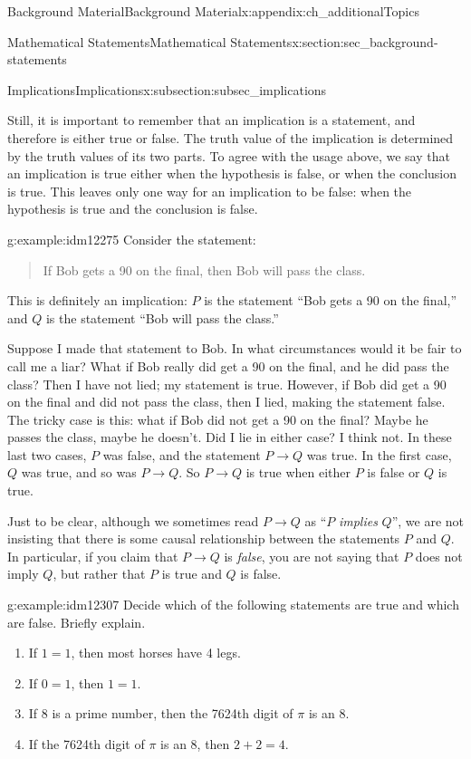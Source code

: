 \documentclass[oneside,10pt,]{book}
\numberwithin{equation}{chapter}
\def\imp{\rightarrow}
\begin{document}
\begin{appendixptx}{Background Material}{}{Background Material}{}{}{x:appendix:ch_additionalTopics}
\begin{sectionptx}{Mathematical Statements}{}{Mathematical Statements}{}{}{x:section:sec_background-statements}
\begin{subsectionptx}{Implications}{}{Implications}{}{}{x:subsection:subsec_implications}
\par
Still, it is important to remember that an implication is a statement, and therefore is either true or false. The truth value of the implication is determined by the truth values of its two parts. To agree with the usage above, we say that an implication is true either when the hypothesis is false, or when the conclusion is true. This leaves only one way for an implication to be false: when the hypothesis is true and the conclusion is false.%
\begin{example}{}{g:example:idm12275}%
Consider the statement:%
\begin{quote}%
If Bob gets a 90 on the final, then Bob will pass the class.%
\end{quote}
This is definitely an implication: \(P\) is the statement ``Bob gets a 90 on the final,'' and \(Q\) is the statement ``Bob will pass the class.''%
\par
Suppose I made that statement to Bob. In what circumstances would it be fair to call me a liar? What if Bob really did get a 90 on the final, and he did pass the class? Then I have not lied; my statement is true. However, if Bob did get a 90 on the final and did not pass the class, then I lied, making the statement false. The tricky case is this: what if Bob did not get a 90 on the final? Maybe he passes the class, maybe he doesn't. Did I lie in either case? I think not. In these last two cases, \(P\) was false, and the statement \(P \imp Q\) was true. In the first case, \(Q\) was true, and so was \(P \imp Q\). So \(P \imp Q\) is true when either \(P\) is false or \(Q\) is true.%
\end{example}
Just to be clear, although we sometimes read \(P \imp Q\) as ``\(P\) \emph{implies} \(Q\)'', we are not insisting that there is some causal relationship between the statements \(P\) and \(Q\). In particular, if you claim that \(P \imp Q\) is \emph{false}, you are not saying that \(P\) does not imply \(Q\), but rather that \(P\) is true and \(Q\) is false.%
\begin{example}{}{g:example:idm12307}%
Decide which of the following statements are true and which are false. Briefly explain.%
\begin{enumerate}
\item{}If \(1=1\), then most horses have 4 legs.%
\item{}If \(0=1\), then \(1=1\).%
\item{}If 8 is a prime number, then the 7624th digit of \(\pi\) is an 8.%
\item{}If the 7624th digit of \(\pi\) is an 8, then \(2+2 = 4\).%

\end{enumerate}
\end{example}
\end{subsectionptx}
\end{sectionptx}
\end{appendixptx}
\end{document}
